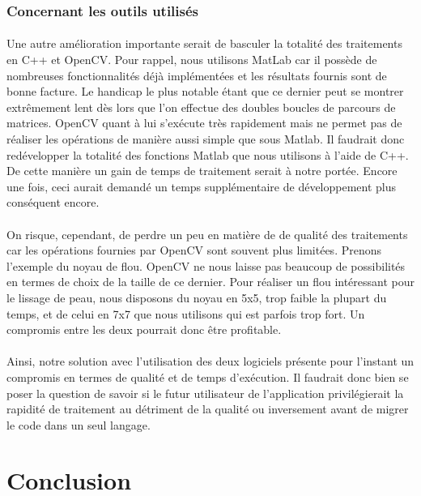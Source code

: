 \documentclass[11pt, french]{report-rd-info}
\begin{document}
\subsubsection{Concernant les outils utilisés}
\paragraph*{}
Une autre amélioration importante serait de basculer la totalité des traitements en C++ et OpenCV. Pour rappel, nous utilisons MatLab car il possède de nombreuses fonctionnalités déjà implémentées et les résultats fournis sont de bonne facture. Le handicap le plus notable étant que ce dernier peut se montrer extrêmement lent dès lors que l'on effectue des doubles boucles de parcours de matrices. OpenCV quant à lui s’exécute très rapidement mais ne permet pas de réaliser les opérations de manière aussi simple que sous Matlab. Il faudrait donc redévelopper la totalité des fonctions Matlab que nous utilisons à l’aide de C++. De cette manière un gain de temps de traitement serait à notre portée. Encore une fois, ceci aurait demandé un temps supplémentaire de développement plus conséquent encore.
\paragraph*{}
On risque, cependant, de perdre un peu en matière de de qualité des traitements car les opérations fournies par OpenCV sont souvent plus limitées. Prenons l’exemple du noyau de flou. OpenCV ne nous laisse pas beaucoup de possibilités en termes de choix de la taille de ce dernier. Pour réaliser un flou intéressant pour le lissage de peau, nous disposons du noyau en 5x5, trop faible la plupart du temps, et de celui en 7x7 que nous utilisons qui est parfois trop fort. Un compromis entre les deux pourrait donc être profitable. 
\paragraph*{}
Ainsi, notre solution avec l’utilisation des deux logiciels présente pour l’instant un compromis en termes de qualité et de temps d’exécution.  Il faudrait donc bien se poser la question de savoir si le futur utilisateur de l’application privilégierait la rapidité de traitement au détriment de la qualité ou inversement avant de migrer le code dans un seul langage.


\section{Conclusion}
\end{document}
